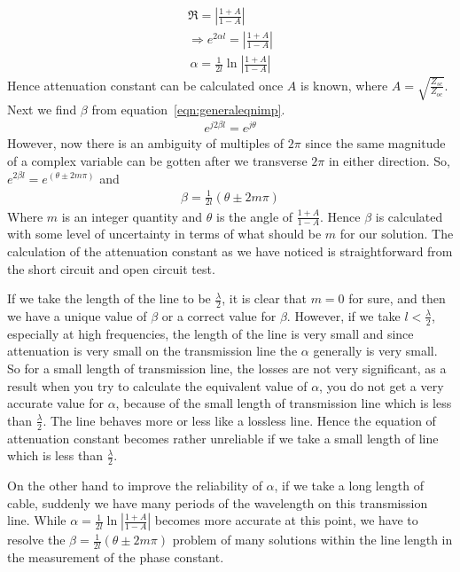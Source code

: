 \begin{align*}
\Re = \left|\frac{1 + A}{1 - A}\right|\\ \Rightarrow e^{2\alpha l} = \left|\frac{1 + A}{1 - A}\right|
\end{align*}
\begin{align}
\alpha = \frac{1}{2l}\ln\left|\frac{1 + A}{1 - A}\right|
\end{align}
Hence attenuation constant can be calculated once $A$ is known, where $A = \sqrt{\frac{Z_{sc}}{Z_{oc}}}$. Next we find $\beta$ from equation~\eqref{eqn:generaleqnimp}.
\begin{align*}
e^{j2\beta l} = e^{j\theta}
\end{align*}
However, now there is an ambiguity of multiples of $2\pi$ since the same magnitude of a complex variable can be gotten after we transverse $2\pi$ in either direction. So, $e^{2\beta l} = e^{(\theta \pm 2m\pi)}$ and
\begin{align}
\beta = \frac{1}{2l} (\theta \pm 2m\pi)
\end{align}
Where $m$ is an integer quantity and $\theta$ is the angle of $\frac{1 + A}{1 - A}$. Hence $\beta$ is calculated with some level of uncertainty in terms of what should be $m$ for our solution. The calculation of the attenuation constant as we have noticed is straightforward from the short circuit and open circuit test.

If we take the length of the line to be $\frac{\lambda}{2}$, it is clear that $m = 0$ for sure, and then we have a unique value of $\beta$ or a correct value for $\beta$. However, if we take $l < \frac{\lambda}{2}$, especially at high frequencies, the length of the line is very small and since attenuation is very small on the transmission line the $\alpha$ generally is very small. So for a small length of transmission line, the losses are not very significant, as a result when you try to calculate the equivalent value of $\alpha$, you do not get a very accurate value for $\alpha$, because of the small length of transmission line which is less than $\frac{\lambda}{2}$. The line behaves more or less like a lossless line. Hence the equation of attenuation constant becomes rather unreliable if we take a small length of line which is less than $\frac{\lambda}{2}$.

On the other hand to improve the reliability of $\alpha$, if we take a long length of cable, suddenly we have many periods of the wavelength on this transmission line. While $\alpha = \frac{1}{2l}\ln\left|\frac{1 + A}{1 - A}\right|$ becomes more accurate at this point, we have to resolve the $\beta = \frac{1}{2l} (\theta \pm 2m\pi)$ problem of many solutions within the line length in the measurement of the phase constant.

